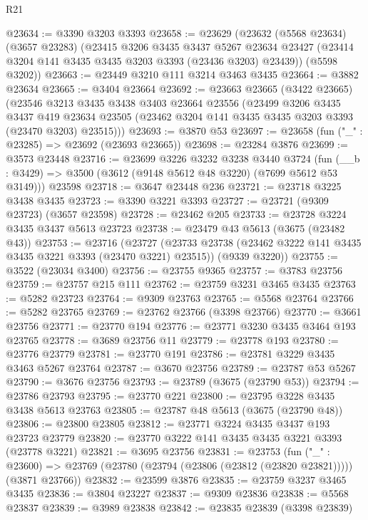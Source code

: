 \begin{lexlean}{R21}
\begin{coremodule}
@23634 := @3390 @3203 @3393
@23658 := @23629
    (@23632
      (@5568 @23634)
      (@3657 @23283)
      (@23415
        @3206
        @3435
        @3437
        @5267
        @23634
        @23427
        (@23414 @3204 @141 @3435 @3435 @3203 @3393 (@23436 @3203) @23439))
      (@5598 @3202))
@23663 := @23449 @3210 @111 @3214 @3463 @3435
@23664 := @3882 @23634
@23665 := @3404 @23664
@23692 := @23663
    @23665
    (@3422 @23665)
    (@23546
      @3213
      @3435
      @3438
      @3403
      @23664
      @23556
      (@23499
        @3206
        @3435
        @3437
        @419
        @23634
        @23505
        (@23462 @3204 @141 @3435 @3435 @3203 @3393 (@23470 @3203) @23515)))
@23693 := @3870 @53
@23697 := @23658 (fun ("_" : @23285) => @23692 (@23693 @23665))
@23698 := @23284 @3876
@23699 := @3573 @23448
@23716 := @23699
    @3226
    @3232
    @3238
    @3440
    @3724
    (fun (__b : @3429) => @3500 (@3612 (@9148 @5612 @48 @3220) (@7699 @5612 @53 @3149)))
    @23598
@23718 := @3647 @23448 @236
@23721 := @23718 @3225 @3438 @3435
@23723 := @3390 @3221 @3393
@23727 := @23721 (@9309 @23723) (@3657 @23598)
@23728 := @23462 @205
@23733 := @23728 @3224 @3435 @3437 @5613 @23723
@23738 := @23479 @43 @5613 (@3675 (@23482 @43))
@23753 := @23716
    (@23727
      (@23733 @23738 (@23462 @3222 @141 @3435 @3435 @3221 @3393 (@23470 @3221) @23515))
      (@9339 @3220))
@23755 := @3522 (@23034 @3400)
@23756 := @23755 @9365
@23757 := @3783 @23756
@23759 := @23757 @215 @111
@23762 := @23759 @3231 @3465 @3435
@23763 := @5282 @23723
@23764 := @9309 @23763
@23765 := @5568 @23764
@23766 := @5282 @23765
@23769 := @23762 @23766 (@3398 @23766)
@23770 := @3661 @23756
@23771 := @23770 @194
@23776 := @23771 @3230 @3435 @3464 @193 @23765
@23778 := @3689 @23756 @11
@23779 := @23778 @193
@23780 := @23776 @23779
@23781 := @23770 @191
@23786 := @23781 @3229 @3435 @3463 @5267 @23764
@23787 := @3670 @23756
@23789 := @23787 @53 @5267
@23790 := @3676 @23756
@23793 := @23789 (@3675 (@23790 @53))
@23794 := @23786 @23793
@23795 := @23770 @221
@23800 := @23795 @3228 @3435 @3438 @5613 @23763
@23805 := @23787 @48 @5613 (@3675 (@23790 @48))
@23806 := @23800 @23805
@23812 := @23771 @3224 @3435 @3437 @193 @23723 @23779
@23820 := @23770 @3222 @141 @3435 @3435 @3221 @3393 (@23778 @3221)
@23821 := @3695 @23756
@23831 := @23753
    (fun ("_" : @23600) =>
    @23769 (@23780 (@23794 (@23806 (@23812 (@23820 @23821))))) (@3871 @23766))
@23832 := @23599 @3876
@23835 := @23759 @3237 @3465 @3435
@23836 := @3804 @23227
@23837 := @9309 @23836
@23838 := @5568 @23837
@23839 := @3989 @23838
@23842 := @23835 @23839 (@3398 @23839)

\end{coremodule}
\end{lexlean}
